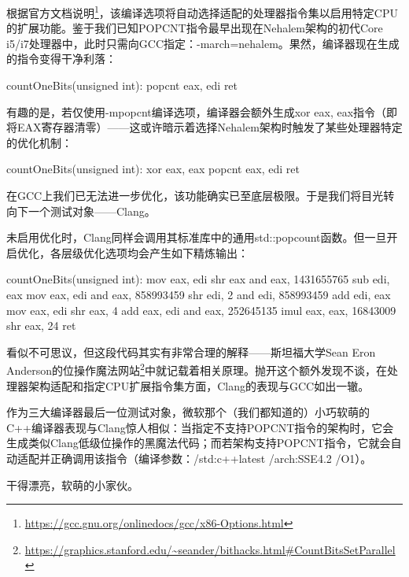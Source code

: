 根据官方文档说明\footnote{\url{https://gcc.gnu.org/onlinedocs/gcc/x86-Options.html}}，该编译选项将自动选择适配的处理器指令集以启用特定CPU的扩展功能。鉴于我们已知POPCNT指令最早出现在Nehalem架构的初代Core i5/i7处理器中，此时只需向GCC指定：-march=nehalem。果然，编译器现在生成的指令变得干净利落：

\begin{shell}
countOneBits(unsigned int):
  popcnt eax, edi
  ret
\end{shell}

有趣的是，若仅使用-mpopcnt编译选项，编译器会额外生成xor eax, eax指令（即将EAX寄存器清零）——这或许暗示着选择Nehalem架构时触发了某些处理器特定的优化机制：

\begin{shell}
countOneBits(unsigned int):
  xor eax, eax
  popcnt eax, edi
  ret
\end{shell}

在GCC上我们已无法进一步优化，该功能确实已至底层极限。于是我们将目光转向下一个测试对象——Clang。

未启用优化时，Clang同样会调用其标准库中的通用std::popcount函数。但一旦开启优化，各层级优化选项均会产生如下精炼输出：

\begin{shell}
countOneBits(unsigned int):
  mov eax, edi
  shr eax
  and eax, 1431655765
  sub edi, eax
  mov eax, edi
  and eax, 858993459
  shr edi, 2
  and edi, 858993459
  add edi, eax
  mov eax, edi
  shr eax, 4
  add eax, edi
  and eax, 252645135
  imul eax, eax, 16843009
  shr eax, 24
  ret
\end{shell}

看似不可思议，但这段代码其实有非常合理的解释——斯坦福大学Sean Eron Anderson的位操作魔法网站\footnote{\url{https://graphics.stanford.edu/~seander/bithacks.html\#CountBitsSetParallel}}中就记载着相关原理。抛开这个额外发现不谈，在处理器架构适配和指定CPU扩展指令集方面，Clang的表现与GCC如出一辙。

作为三大编译器最后一位测试对象，微软那个（我们都知道的）小巧软萌的C++编译器表现与Clang惊人相似：当指定不支持POPCNT指令的架构时，它会生成类似Clang低级位操作的黑魔法代码；而若架构支持POPCNT指令，它就会自动适配并正确调用该指令（编译参数：/std:c++latest /arch:SSE4.2 /O1）。

干得漂亮，软萌的小家伙。


























